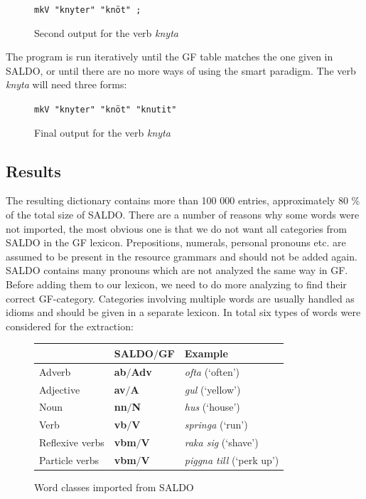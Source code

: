 \documentclass[10pt, a4paper]{article}
\begin{document}
\begin{figure}[h]
\begin{center}
\verb-mkV "knyter" "knöt" ;-
\caption{Second output for the verb \emph{knyta}}
\label{fig:saldoknyt2}
\end{center}
\end{figure}

The program is run iteratively until the GF table matches the one given in SALDO,
or until there are no more ways of using the smart paradigm. The verb \emph{knyta}
will need three forms:\\

\begin{figure}[h]
\begin{center}
\verb-mkV "knyter" "knöt" "knutit"-\\
\caption{Final output for the verb \emph{knyta}}
\label{fig:saldoknyt3}
\end{center}
\end{figure}


\subsection{Results}
\label{sec:saldoRes}
The resulting dictionary contains more than 100 000 entries, approximately 80 \% 
of the total size of SALDO.
There are a number of reasons why some words were not imported,
the most obvious one is that we do not want all categories from
SALDO in the GF lexicon. Prepositions, 
numerals, 
personal pronouns etc.
are assumed to be present in the resource grammars and should not be added again.
SALDO contains many pronouns which
are not analyzed the same way in GF. 
Before adding them to our lexicon, we need to do more analyzing to find their
correct GF-category. 
Categories involving multiple words 
are usually handled as idioms and should be given in a separate lexicon. In
total six types of words were considered for the extraction: \\

\begin{figure}[h]
\begin{tabular}{|l|ll|}
\hline
& SALDO$/$GF & Example \\
\hline
 Adverb & \textbf{ab}$/$\textbf{Adv} & \emph{ofta} (`often')\\
 Adjective&\textbf{av}$/$\textbf{A} & \emph{gul} (`yellow')\\
 Noun & \textbf{nn}$/$\textbf{N} & \emph{hus} (`house')\\
 Verb & \textbf{vb}$/$\textbf{V} & \emph{springa} (`run')\\
 Reflexive verbs &\textbf{vbm}$/$\textbf{V} & \emph{raka sig} (`shave')\\
 Particle verbs &\textbf{vbm}$/$\textbf{V}  &  \emph{piggna till} (`perk up')\\
\hline
\end{tabular}
\caption{Word classes imported from SALDO}
\end{figure}
\end{document}
